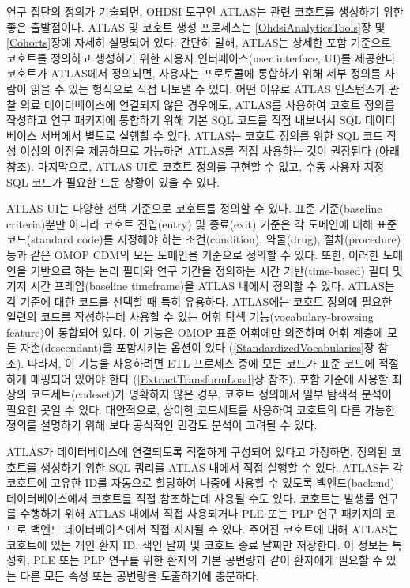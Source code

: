 \documentclass[11pt]{book}
\theoremstyle{definition}
\theoremstyle{definition}
\theoremstyle{definition}
\theoremstyle{remark}
\begin{document}
연구 집단의 정의가 기술되면, OHDSI 도구인 ATLAS는 관련 코호트를 생성하기
위한 좋은 출발점이다. ATLAS 및 코호트 생성 프로세스는
\ref{OhdsiAnalyticsTools}장 및 \ref{Cohorts}장에 자세히 설명되어 있다.
간단히 말해, ATLAS는 상세한 포함 기준으로 코호트를 정의하고 생성하기
위한 사용자 인터페이스(user interface, UI)를 제공한다. 코호트가
ATLAS에서 정의되면, 사용자는 프로토콜에 통합하기 위해 세부 정의를 사람이
읽을 수 있는 형식으로 직접 내보낼 수 있다. 어떤 이유로 ATLAS 인스턴스가
관찰 의료 데이터베이스에 연결되지 않은 경우에도, ATLAS를 사용하여 코호트
정의를 작성하고 연구 패키지에 통합하기 위해 기본 SQL 코드를 직접
내보내서 SQL 데이터베이스 서버에서 별도로 실행할 수 있다. ATLAS는 코호트
정의를 위한 SQL 코드 작성 이상의 이점을 제공하므로 가능하면 ATLAS를 직접
사용하는 것이 권장된다 (아래 참조). 마지막으로, ATLAS UI로 코호트 정의를
구현할 수 없고, 수동 사용자 지정 SQL 코드가 필요한 드문 상황이 있을 수
있다.

ATLAS UI는 다양한 선택 기준으로 코호트를 정의할 수 있다. 표준
기준(baseline criteria)뿐만 아니라 코호트 진입(entry) 및 종료(exit)
기준은 각 도메인에 대해 표준 코드(standard code)를 지정해야 하는
조건(condition), 약물(drug), 절차(procedure) 등과 같은 OMOP CDM의 모든
도메인을 기준으로 정의할 수 있다. 또한, 이러한 도메인을 기반으로 하는
논리 필터와 연구 기간을 정의하는 시간 기반(time-based) 필터 및 기저 시간
프레임(baseline timeframe)을 ATLAS 내에서 정의할 수 있다. ATLAS는 각
기준에 대한 코드를 선택할 때 특히 유용하다. ATLAS에는 코호트 정의에
필요한 일련의 코드를 작성하는데 사용할 수 있는 어휘 탐색
기능(vocabulary-browsing feature)이 통합되어 있다. 이 기능은 OMOP 표준
어휘에만 의존하며 어휘 계층에 모든 자손(descendant)을 포함시키는 옵션이
있다 (\ref{StandardizedVocabularies}장 참조). 따라서, 이 기능을
사용하려면 ETL 프로세스 중에 모든 코드가 표준 코드에 적절하게 매핑되어
있어야 한다 (\ref{ExtractTransformLoad}장 참조). 포함 기준에 사용할
최상의 코드세트(codeset)가 명확하지 않은 경우, 코호트 정의에서 일부
탐색적 분석이 필요한 곳일 수 있다. 대안적으로, 상이한 코드세트를
사용하여 코호트의 다른 가능한 정의를 설명하기 위해 보다 공식적인 민감도
분석이 고려될 수 있다.

ATLAS가 데이터베이스에 연결되도록 적절하게 구성되어 있다고 가정하면,
정의된 코호트를 생성하기 위한 SQL 쿼리를 ATLAS 내에서 직접 실행할 수
있다. ATLAS는 각 코호트에 고유한 ID를 자동으로 할당하여 나중에 사용할 수
있도록 백엔드(backend) 데이터베이스에서 코호트를 직접 참조하는데 사용될
수도 있다. 코호트는 발생률 연구를 수행하기 위해 ATLAS 내에서 직접
사용되거나 PLE 또는 PLP 연구 패키지의 코드로 백엔드 데이터베이스에서
직접 지시될 수 있다. 주어진 코호트에 대해 ATLAS는 코호트에 있는 개인
환자 ID, 색인 날짜 및 코호트 종료 날짜만 저장한다. 이 정보는 특성화, PLE
또는 PLP 연구를 위한 환자의 기본 공변량과 같이 환자에게 필요할 수 있는
다른 모든 속성 또는 공변량을 도출하기에 충분하다.
\end{document}
